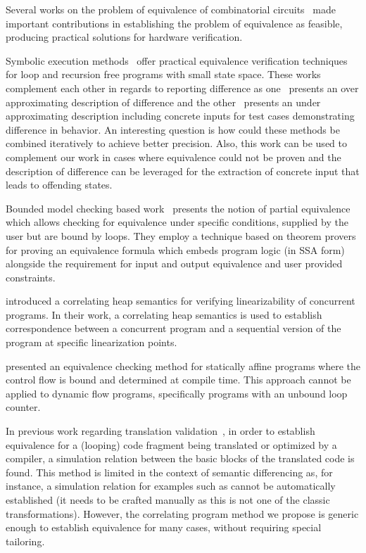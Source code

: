 Several works on the problem of equivalence of combinatorial circuits~\cite{KuehlmannKrohm97,BraytonChatterjeeMishchenkoEen06,ClarkeKroening03} made important contributions in establishing the problem of equivalence as feasible, producing practical solutions for hardware verification.

Symbolic execution methods~\cite{DwyerElbaumPerson08,EnglerRamos11} offer practical equivalence verification techniques for loop and recursion free programs with small state space. These works complement each other in regards to reporting difference as one~\cite{DwyerElbaumPerson08} presents an over approximating description of difference and the other~\cite{EnglerRamos11} presents an under approximating description including concrete inputs for test cases demonstrating difference in behavior. An interesting question is how could these methods be combined iteratively to achieve better precision. Also, this work can be used to complement our work in cases where equivalence could not be proven and the description of difference can be leveraged for the extraction of concrete input that leads to offending states.

Bounded model checking based work~\cite{GodlinStrichman09} presents the notion of partial equivalence which allows checking for equivalence under specific conditions, supplied by the user but are bound by loops. They employ a technique based on theorem provers for proving an equivalence formula which embeds program logic (in SSA form) alongside the requirement for input and output equivalence and user provided constraints.

\cite{AmitRinetzkyRepsSagivYahav07} introduced a correlating heap semantics for verifying linearizability of concurrent programs. In their work, a correlating heap semantics is used to establish correspondence between a concurrent program and a sequential version of the program at specific linearization points.

\cite{BruynoogheJanssensVerdoolaege2009} presented an equivalence checking method for statically affine programs where the control flow is bound and determined at compile time. This approach cannot be applied to dynamic flow programs, specifically programs with an unbound loop counter.

In previous work regarding translation validation~\cite{PnueliSiegelSingerman98,Necula00,HuGoldbergFangPnueliZuck02}, in order to establish equivalence for a (looping) code fragment being translated or optimized by a compiler, a simulation relation between the basic blocks of the translated code is found. This method is limited in the context of semantic differencing as, for instance, a simulation relation for examples such as  cannot be automatically established (it needs to be crafted manually as this is not one of the classic transformations). However, the correlating program method we propose is generic enough to establish equivalence for many cases, without requiring special tailoring.

